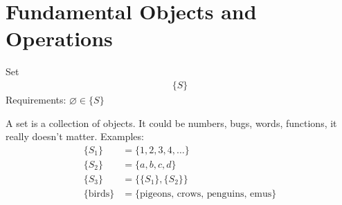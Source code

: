 \section{Fundamental Objects and Operations}
	\begin{mathbox}{Set}
		\begin{align*}
			\{S\}
		\end{align*}
		Requirements:
		\(\varnothing\in\{S\}\)
	\end{mathbox}
	A set is a collection of objects. It could be numbers, bugs, words, functions, it really doesn't matter.
	Examples:
	\begin{align*}
		\{S_1\} &= \{1,2,3,4,\ldots\}
		\\
		\{S_2\} &= \{a,b,c,d\}
		\\
		\{S_3\} &= \{\{S_1\}, \{S_2\}\}
		\\
		\{\text{birds}\} &= \{\text{pigeons},\,\text{crows},\,\text{penguins},\,\text{emus}\}
	\end{align*}
